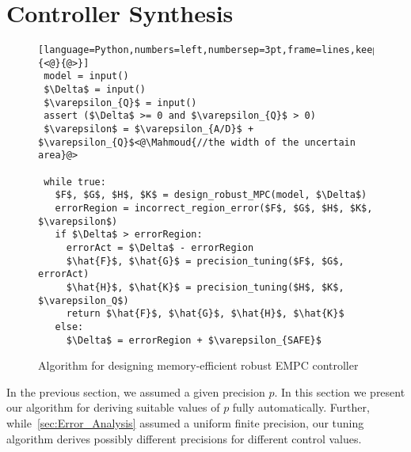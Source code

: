 \section{Controller Synthesis}\label{sec:Controller_Synthesis}

\begin{figure}
\begin{lstlisting}[language=Python,numbers=left,numbersep=3pt,frame=lines,keepspaces=true,mathescape=true,basicstyle=\small\ttfamily,escapeinside={<@}{@>}]
 model = input() 
 $\Delta$ = input()
 $\varepsilon_{Q}$ = input()
 assert ($\Delta$ >= 0 and $\varepsilon_{Q}$ > 0)
 $\varepsilon$ = $\varepsilon_{A/D}$ + $\varepsilon_{Q}$<@\Mahmoud{//the width of the uncertain area}@>

 while true:
   $F$, $G$, $H$, $K$ = design_robust_MPC(model, $\Delta$)
   errorRegion = incorrect_region_error($F$, $G$, $H$, $K$, $\varepsilon$)
   if $\Delta$ > errorRegion:
     errorAct = $\Delta$ - errorRegion
     $\hat{F}$, $\hat{G}$ = precision_tuning($F$, $G$, errorAct)
     $\hat{H}$, $\hat{K}$ = precision_tuning($H$, $K$, $\varepsilon_Q$)
     return $\hat{F}$, $\hat{G}$, $\hat{H}$, $\hat{K}$
   else:
     $\Delta$ = errorRegion + $\varepsilon_{SAFE}$
\end{lstlisting}
\caption{Algorithm for designing memory-efficient robust EMPC controller}
\label{lst:alg}
\end{figure}


In the previous section, we assumed a given precision $p$. In this section we
present our algorithm for deriving suitable values of $p$ fully automatically.
Further, while~\autoref{sec:Error_Analysis} assumed a uniform finite precision,
our tuning algorithm derives possibly different precisions for different control
values.

